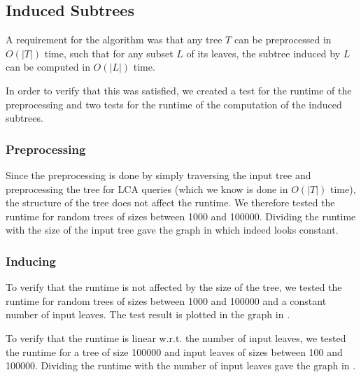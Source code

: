 \subsection{Induced Subtrees}
A requirement for the algorithm was that any tree $T$ can be preprocessed in $O(|T|)$ time, such that for any subset $L$ of its leaves, the subtree induced by $L$ can be computed in $O(|L|)$ time.

In order to verify that this was satisfied, we created a test for the runtime of the preprocessing and two tests for the runtime of the computation of the induced subtrees.

\subsubsection{Preprocessing}
Since the preprocessing is done by simply traversing the input tree and preprocessing the tree for LCA queries (which we know is done in $O(|T|)$ time), the structure of the tree does not affect the runtime. We therefore tested the runtime for random trees of sizes between 1000 and 100000. Dividing the runtime with the size of the input tree gave the graph in  which indeed looks constant.

\subsubsection{Inducing}
To verify that the runtime is not affected by the size of the tree, we tested the runtime for random trees of sizes between 1000 and 100000 and a constant number of input leaves. The test result is plotted in the graph in .

To verify that the runtime is linear w.r.t. the number of input leaves, we tested the runtime for a tree of size 100000 and input leaves of sizes between 100 and 100000. Dividing the runtime with the number of input leaves gave the graph in .



